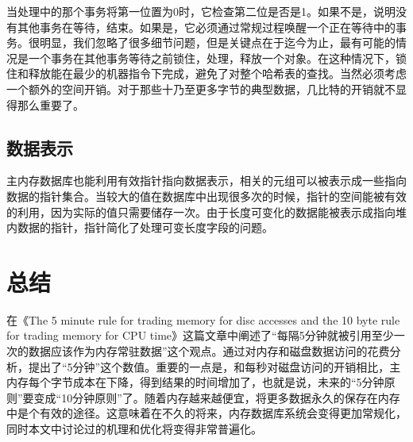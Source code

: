 \documentclass[translation]{zjutreport}
\begin{document}
当处理中的那个事务将第一位置为0时，它检查第二位是否是1。如果不是，说明没有其他事务在等待，结束。如果是，它必须通过常规过程唤醒一个正在等待中的事务。很明显，我们忽略了很多细节问题，但是关键点在于迄今为止，最有可能的情况是一个事务在其他事务等待之前锁住，处理，释放一个对象。在这种情况下，锁住和释放能在最少的机器指令下完成，避免了对整个哈希表的查找。当然必须考虑一个额外的空间开销。对于那些十乃至更多字节的典型数据，几比特的开销就不显得那么重要了。

\section{数据表示}
主内存数据库也能利用有效指针指向数据表示，相关的元组可以被表示成一些指向数据的指针集合。当较大的值在数据库中出现很多次的时候，指针的空间能被有效的利用，因为实际的值只需要储存一次。由于长度可变化的数据能被表示成指向堆内数据的指针，指针简化了处理可变长度字段的问题。


\chapter{总结}
在《The 5 minute rule for trading memory for disc 
accesses and the 10 byte rule for trading memory for CPU time》这篇文章中阐述了“每隔5分钟就被引用至少一次的数据应该作为内存常驻数据”这个观点。通过对内存和磁盘数据访问的花费分析，提出了“5分钟”这个数值。重要的一点是，和每秒对磁盘访问的开销相比，主内存每个字节成本在下降，得到结果的时间增加了，也就是说，未来的“5分钟原则”要变成“10分钟原则”了。随着内存越来越便宜，将更多数据永久的保存在内存中是个有效的途径。这意味着在不久的将来，内存数据库系统会变得更加常规化，同时本文中讨论过的机理和优化将变得非常普遍化。

\backmatter %
\endgroup %



\clearpage %

\nocite{*}                                   %


\end{document}
